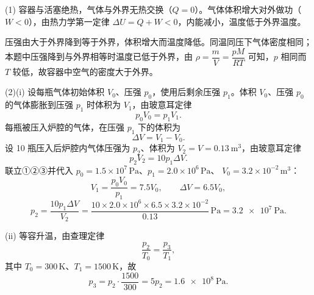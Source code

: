 \begin{answer}
(1) 容器与活塞绝热，气体与外界无热交换（$Q=0$）。气体体积增大对外做功（$W<0$），由热力学第一定律
$\Delta U=Q+W<0$，内能减小，温度低于外界温度。

压强由大于外界降到等于外界，体积增大而温度降低。同温同压下气体密度相同；本题中压强降到与外界相等时温度已低于外界，由 $\rho=\dfrac{m}{V}=\dfrac{pM}{RT}$ 可知，$p$ 相同而 $T$ 较低，故容器中空气的密度大于外界。

(2)(i) 设每瓶气体初始体积 $V_{0}$、压强 $p_{0}$，使用后剩余压强 $p_{1}$。体积 $V_{0}$、压强 $p_{0}$ 的气体膨胀到压强 $p_{1}$ 时体积为 $V_{1}$，由玻意耳定律
\[
  p_{0}V_{0}=p_{1}V_{1}. \tag{①}
\]
每瓶被压入炉腔的气体，在压强 $p_{1}$ 下的体积为
\[
  \Delta V=V_{1}-V_{0}. \tag{②}
\]
设 10 瓶压入后炉腔内气体压强为 $p_{2}$、体积为 $V_{2}=V=\SI{0.13}{\metre\cubed}$，由玻意耳定律
\[
  p_{2}V_{2}=10p_{1}\Delta V. \tag{③}
\]
联立①②③并代入 $p_{0}=1.5\times10^{7}\,\si{\pascal}$、$p_{1}=2.0\times10^{6}\,\si{\pascal}$、
$V_{0}=3.2\times10^{-2}\,\si{\metre\cubed}$：
\[
  V_{1}=\frac{p_{0}V_{0}}{p_{1}}=7.5V_{0},\qquad \Delta V=6.5V_{0},
\]
\[
  p_{2}=\frac{10p_{1}\Delta V}{V_{2}}
      =\frac{10\times2.0\times10^{6}\times6.5\times3.2\times10^{-2}}{0.13}\,\si{\pascal}
      =\SI{3.2e7}{\pascal}.
\]

(ii) 等容升温，由查理定律
\[
  \frac{p_{2}}{T_{0}}=\frac{p_{3}}{T_{1}},
\]
其中 $T_{0}=300\,\si{\kelvin}$、$T_{1}=1500\,\si{\kelvin}$，故
\[
  p_{3}=p_{2}\cdot\frac{1500}{300}=5p_{2}=\SI{1.6e8}{\pascal}.
\]
\end{answer}


